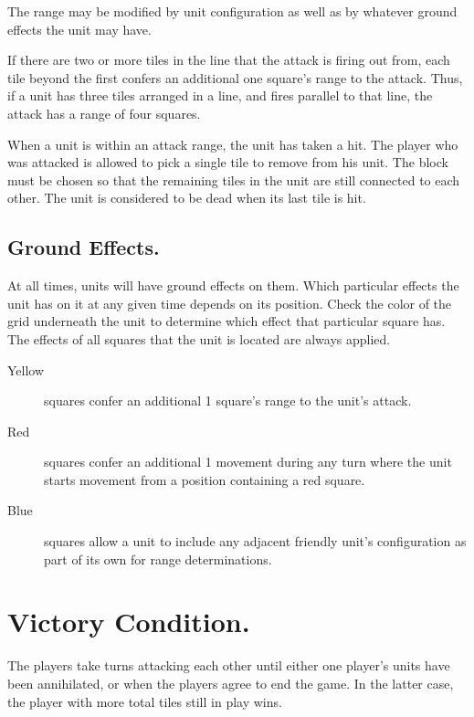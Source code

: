 The range may be modified by unit configuration as well as by whatever ground effects the unit may have.

If there are two or more tiles in the line that the attack is firing out from, each tile beyond the first confers an additional one square's range to the attack.
Thus, if a unit has three tiles arranged in a line, and fires parallel to that line, the attack has a range of four squares.

When a unit is within an attack range, the unit has taken a hit.
The player who was attacked is allowed to pick a single tile to remove from his unit.
The block must be chosen so that the remaining tiles in the unit are still connected to each other.
The unit is considered to be dead when its last tile is hit.

\subsection{Ground Effects.}

At all times, units will have ground effects on them.
Which particular effects the unit has on it at any given time depends on its position.
Check the color of the grid underneath the unit to determine which effect that particular square has.
The effects of all squares that the unit is located are always applied.

\begin{description}
\item[Yellow] squares confer an additional 1 square's range to the unit's attack.
\item[Red] squares confer an additional 1 movement during any turn where the unit starts movement from a position containing a red square.
\item[Blue] squares allow a unit to include any adjacent friendly unit's configuration as part of its own for range determinations.
\end{description}

\section{Victory Condition.}

The players take turns attacking each other until either one player's units have been annihilated, or when the players agree to end the game.
In the latter case, the player with more total tiles still in play wins.

